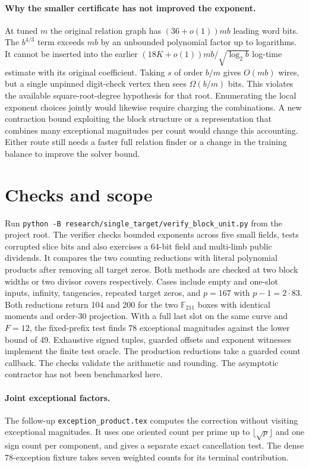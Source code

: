 \documentclass[11pt]{article}
\begin{document}
\paragraph{Why the smaller certificate has not improved the exponent.}
At tuned $m$ the original relation graph has $(36+o(1))mb$ leading
word bits. The $b^{4/3}$ term exceeds $mb$ by an unbounded polynomial
factor up to logarithms. It cannot be inserted into the earlier
$(18K+o(1))mb/\sqrt{\log_2 b}$ log-time estimate with its original
coefficient. Taking $s$ of order $b/m$ gives $O(mb)$ wires, but a
single unpinned digit-check vertex then sees $\Omega(b/m)$ bits.
This violates the available square-root-degree hypothesis for that
root. Enumerating the local exponent choices jointly would likewise
require charging the combinations. A new contraction bound exploiting
the block structure or a representation that combines many exceptional
magnitudes per count would change this accounting. Either route still
needs a faster full relation finder or a change in the training balance
to improve the solver bound.

\section{Checks and scope}
Run \texttt{python -B research/single\_target/verify\_block\_unit.py}
from the project root. The verifier checks bounded exponents across
five small fields, tests corrupted slice bits and also exercises a 64-bit
field and multi-limb public dividends. It compares the two
counting reductions with literal polynomial products after removing
all target zeros. Both methods are checked at two block widths or two
divisor covers respectively. Cases include empty and one-slot
inputs, infinity, tangencies, repeated target zeros, and $p=167$ with
$p-1=2\cdot83$. Both reductions return 104 and 200 for the two
$\mathbb F_{211}$ boxes with identical moments and order-30 projection.
With a full last slot on the same curve and $F=12$, the fixed-prefix
test finds 78 exceptional magnitudes against the lower bound of 49.
Exhaustive signed tuples, guarded offsets and exponent
witnesses implement the finite test oracle. The production reductions
take a guarded count callback. The checks validate the arithmetic and
rounding. The asymptotic contractor has not been benchmarked here.

\paragraph{Joint exceptional factors.}
The follow-up \texttt{exception\_product.tex} computes the correction
without visiting exceptional magnitudes. It uses one oriented count
per prime up to $\lfloor\sqrt p\rfloor$ and one sign count per component,
and gives a separate exact cancellation test. The dense 78-exception
fixture takes seven weighted counts for its terminal contribution.
\end{document}
